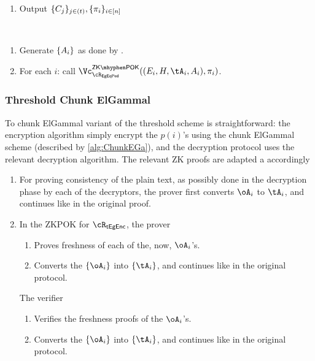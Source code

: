 \begin{description}
\begin{description}
\begin{enumerate}
	\item Output $\{C_j\}_{j\in (t)},\{\pi_i\}_{i\in [n]}$
\end{enumerate}


\item[\Vc:]   ~

\begin{enumerate}
	
	\item Generate   $\set{A_i}$ as done by \Pc.
	
	\item For each $i$: call $\vZKPOK{\rEgEqPed}((E_i,H,\tA_i,A_i),\pi_i)$.
\end{enumerate}
\end{description}
\end{description}

\subsubsection{Threshold   Chunk ElGammal}
To chunk ElGammal  variant of the threshold scheme is straightforward: the encryption algorithm simply encrypt the $p(i)$'s using the  chunk ElGammal scheme (described by \cref{alg:ChunkEGa}), and the decryption protocol uses the relevant decryption algorithm.  The relevant ZK proofs are adapted a accordingly

\begin{enumerate}
	
	\item For proving consistency of the plain text, as possibly done in the decryption  phase by each of the decryptors, the  prover first converts $\oA_i$   to $\tA_i$, and continues like in the original proof.
	 
	\item In the ZKPOK for  $\rTsEgEnc$, the prover
	\begin{enumerate}
		\item Proves freshness of each of the, now,   $\oA_i$'s.
		
		\item  	Converts the  $\sset{\oA_i}$ into $\sset{\tA_i}$, and continues like in the original protocol.
		
	\end{enumerate}

    The verifier 
    \begin{enumerate}
    	\item Verifies the freshness proofs of the   $\oA_i$'s.
    	
    	\item  	Converts the  $\sset{\oA_i}$ into $\sset{\tA_i}$, and continues like in the original protocol.
    	
    \end{enumerate}
    
	
\end{enumerate} 


